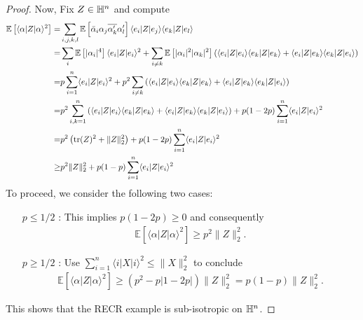 \begin{proof}
  Now, Fix $ Z \in \mathbb{H}^n$ and compute
  \begin{align}
    \mathbb{E} \left[ \langle \alpha |  Z | \alpha \rangle^2 \right]
    =& \sum_{i,j,k,l} \mathbb{E} \left[ \bar{\alpha}_i \alpha_j \overline{\alpha^\prime_k} \alpha^\prime_l \right] \langle  e_i| Z|  e_j \rangle \langle  e_k | Z|  e_l \rangle \\
    =& \sum_{i} \mathbb{E} \left[ | \alpha_i |^4 \right] \langle  e_i| Z| e_i \rangle^2 + \sum_{i \neq k} \mathbb{E} \left[ | \alpha_i |^2 | \alpha_k|^2 \right] \left( \langle  e_i| Z| e_i \rangle \langle  e_k| Z| e_k \rangle + \langle  e_i| Z| e_k \rangle \langle  e_k|  Z| e_i \rangle \right) \\
    =& p \sum_{i=1}^n \langle  e_i| Z| e_i \rangle^2 + p^2 \sum_{i \neq k} \left( \langle  e_i| Z| e_i \rangle \langle  e_k| Z| e_k \rangle + \langle  e_i| Z| e_k \rangle \langle  e_k | Z|  e_i\rangle \right) \\
    =& p^2 \sum_{i,k=1}^n \left( \langle  e_i| Z| e_i \rangle \langle  e_k| Z| e_k \rangle + \langle  e_i| Z| e_k \rangle \langle  e_k | Z|  e_i\rangle \right) + p(1-2 p) \sum_{i=1}^n \langle  e_i| Z| e_i \rangle^2 \\
    =& p^2 \left( \operatorname{tr} ( Z)^2 + \| Z\|_2^2 \right) + p (1-2 p) \sum_{i=1}^n \langle  e_i|  Z |  e_i \rangle^2 \\
    \geq& p^2 \| Z\|_2^2 + p(1-p) \sum_{i=1}^n \langle  e_i | Z| e_i \rangle^2
  \end{align}
  To proceed, we consider the following two cases:
  \begin{itemize}
    \item[$p \leq 1/2$]: This implies $p(1-2p) \geq 0$ and consequently
      \begin{align}
        \mathbb{E} \left[ \langle \alpha | Z| \alpha \rangle^2 \right] \geq p^2 \|  Z \|_2^2.
      \end{align}
    \item[$p \geq 1/2$]: Use $\sum_{i=1}^n \langle i| X|i \rangle^2 \leq \| X \|_2^2$ to conclude
      \begin{align}
        \mathbb{E} \left[ \langle \alpha |  Z | \alpha \rangle^2 \right]
        \geq ( p^2 - p|1-2p|) \| Z\|_2^2 = p(1-p) \|  Z \|_2^2.
      \end{align}
  \end{itemize}
  This shows that the RECR example is sub-isotropic on $\mathbb{H}^n$.


\end{proof}
